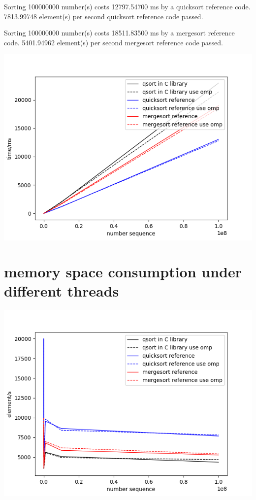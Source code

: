 \documentclass[12pt]{article}
\begin{document}
Sorting 100000000 number(s) costs 12797.54700 ms by a quicksort reference code. 7813.99748 element(s) per second
quicksort reference code passed.

Sorting 100000000 number(s) costs 18511.83500 ms by a mergesort reference code. 5401.94962 element(s) per second
mergesort reference code passed.


\includegraphics[scale=0.5]{1s}

\section{memory space consumption under different threads}

\includegraphics[scale=0.5]{2s}
\end{document}
